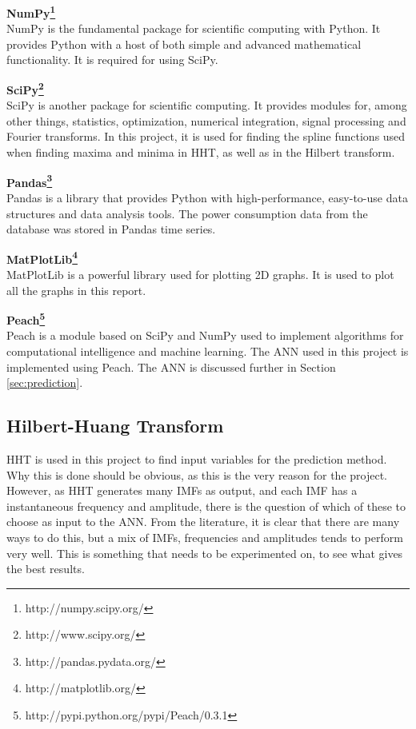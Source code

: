 \documentclass[12pt]{article}
\begin{document}
		\begin{description}
			\item \textbf{NumPy\footnote{http://numpy.scipy.org/}} \hfill \\
			NumPy is the fundamental package for scientific computing with Python. It provides Python with a host of both simple and advanced mathematical functionality. It is required for using SciPy.
			\item \textbf{SciPy\footnote{http://www.scipy.org/}} \hfill \\
			SciPy is another package for scientific computing. It provides modules for, among other things, statistics, optimization, numerical integration, signal processing and Fourier transforms. In this project, it is used for finding the spline functions used when finding maxima and minima in HHT, as well as in the Hilbert transform.
			\item \textbf{Pandas\footnote{http://pandas.pydata.org/}} \hfill \\
			Pandas is a library that provides Python with high-performance, easy-to-use data structures and data analysis tools. The power consumption data from the database was stored in Pandas time series.
			\item \textbf{MatPlotLib\footnote{http://matplotlib.org/}} \hfill \\
			MatPlotLib is a powerful library used for plotting 2D graphs. It is used to plot all the graphs in this report.
			\item \textbf{Peach\footnote{http://pypi.python.org/pypi/Peach/0.3.1}} \hfill \\
			Peach is a module based on SciPy and NumPy used to implement algorithms for computational intelligence and machine learning. The ANN used in this project is implemented using Peach. The ANN is discussed further in Section \ref{sec:prediction}.
		\end{description}
	
	\subsection{Hilbert-Huang Transform}
		\label{sec:hht}
		HHT is used in this project to find input variables for the prediction method. Why this is done should be obvious, as this is the very reason for the project. However, as HHT generates many IMFs as output, and each IMF has a instantaneous frequency and amplitude, there is the question of which of these to choose as input to the ANN. From the literature, it is clear that there are many ways to do this, but a mix of IMFs, frequencies and amplitudes tends to perform very well. This is something that needs to be experimented on, to see what gives the best results. 
		
\end{document}
